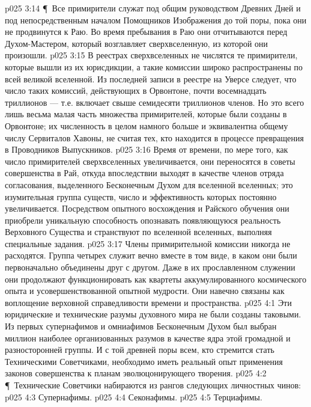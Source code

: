 \vs p025 3:14 \P\ Все примирители служат под общим руководством Древних Дней и под непосредственным началом Помощников Изображения до той поры, пока они не продвинутся к Раю. Во время пребывания в Раю они отчитываются перед Духом\hyp{}Мастером, который возглавляет сверхвселенную, из которой они произошли.
\vs p025 3:15 В реестрах сверхвселенных не числятся те примирители, которые вышли из их юрисдикции, а такие комиссии широко распространены по всей великой вселенной. Из последней записи в реестре на Уверсе следует, что число таких комиссий, действующих в Орвонтоне, почти восемнадцать триллионов --- т.е. включает свыше семидесяти триллионов членов. Но это всего лишь весьма малая часть множества примирителей, которые были созданы в Орвонтоне; их численность в целом намного больше и эквивалентна общему числу Сервиталов Хавоны, не считая тех, кто находится в процессе превращения в Проводников Выпускников.
\vs p025 3:16 Время от времени, по мере того, как число примирителей сверхвселенных увеличивается, они переносятся в советы совершенства в Рай, откуда впоследствии выходят в качестве членов отряда согласования, выделенного Бесконечным Духом для вселенной вселенных; это изумительная группа существ, число и эффективность которых постоянно увеличивается. Посредством опытного восхождения и Райского обучения они приобрели уникальную способность опознавать появляющуюся реальность Верховного Существа и странствуют по вселенной вселенных, выполняя специальные задания.
\vs p025 3:17 Члены примирительной комиссии никогда не расходятся. Группа четырех служит вечно вместе в том виде, в каком они были первоначально объединены друг с другом. Даже в их прославленном служении они продолжают функционировать как квартеты аккумулированного космического опыта и усовершенствованной опытной мудрости. Они навечно связаны как воплощение верховной справедливости времени и пространства.
\vs p025 4:1 Эти юридические и технические разумы духовного мира не были созданы таковыми. Из первых супернафимов и омниафимов Бесконечным Духом был выбран миллион наиболее организованных разумов в качестве ядра этой громадной и разносторонней группы. И с той древней поры всем, кто стремится стать Техническими Советчиками, необходимо иметь реальный опыт применения законов совершенства к планам эволюцонирующего творения.
\vs p025 4:2 \P\ Технические Советчики набираются из рангов следующих личностных чинов:
\vs p025 4:3 \bibnobreakspace Супернафимы.
\vs p025 4:4 \bibnobreakspace Секонафимы.
\vs p025 4:5 \bibnobreakspace Терциафимы.
